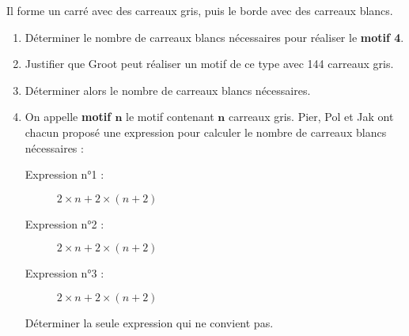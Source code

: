 \begin{exercice*}
    Il forme un carré avec des carreaux gris, puis le borde avec des carreaux blancs.
    \begin{enumerate}
        \item Déterminer le nombre de carreaux blancs nécessaires pour réaliser le {\bfseries motif 4}.
        \item Justifier que Groot peut réaliser un motif de ce type avec \num{144} carreaux gris.
        \item Déterminer alors le nombre de carreaux blancs nécessaires.
        \item On appelle {\bfseries motif $\boldsymbol{n}$} le motif contenant {\bfseries $\boldsymbol{n}$} carreaux gris. Pier, Pol et Jak ont chacun proposé une expression
        pour calculer le nombre de carreaux blancs nécessaires :
        \begin{description}
            \item[Expression n°1 : ] $2\times n + 2\times(n+2)$
            \item[Expression n°2 : ] $2\times n + 2\times(n+2)$
            \item[Expression n°3 : ] $2\times n + 2\times(n+2)$
        \end{description}
        Déterminer la seule expression qui ne convient pas.
    \end{enumerate}
\end{exercice*}
